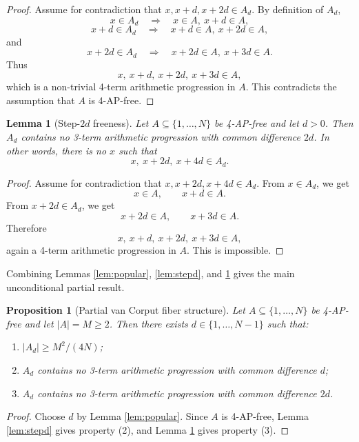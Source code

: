 \documentclass[11pt]{article}
\newtheorem{lemma}[theorem]{Lemma}
\newtheorem{proposition}[theorem]{Proposition}
\begin{document}
\begin{proof}
Assume for contradiction that \(x,x+d,x+2d\in A_d\).  By definition of \(A_d\),
\[
  x\in A_d \quad\Rightarrow\quad x\in A,\ x+d\in A,
\]
\[
  x+d\in A_d \quad\Rightarrow\quad x+d\in A,\ x+2d\in A,
\]
and
\[
  x+2d\in A_d \quad\Rightarrow\quad x+2d\in A,\ x+3d\in A.
\]
Thus
\[
  x,\ x+d,\ x+2d,\ x+3d\in A,
\]
which is a non-trivial 4-term arithmetic progression in \(A\).  This contradicts
the assumption that \(A\) is 4-AP-free.
\end{proof}

\begin{lemma}[Step-\(2d\) freeness]
\label{lem:step2d}
Let \(A\subseteq\{1,\ldots,N\}\) be 4-AP-free and let \(d>0\).  Then \(A_d\)
contains no 3-term arithmetic progression with common difference \(2d\).  In
other words, there is no \(x\) such that
\[
  x,\ x+2d,\ x+4d\in A_d.
\]
\end{lemma}

\begin{proof}
Assume for contradiction that \(x,x+2d,x+4d\in A_d\).  From \(x\in A_d\), we get
\[
  x\in A,\qquad x+d\in A.
\]
From \(x+2d\in A_d\), we get
\[
  x+2d\in A,\qquad x+3d\in A.
\]
Therefore
\[
  x,\ x+d,\ x+2d,\ x+3d\in A,
\]
again a 4-term arithmetic progression in \(A\).  This is impossible.
\end{proof}

Combining Lemmas \ref{lem:popular}, \ref{lem:stepd}, and \ref{lem:step2d} gives
the main unconditional partial result.

\begin{proposition}[Partial van Corput fiber structure]
\label{prop:partial}
Let \(A\subseteq\{1,\ldots,N\}\) be 4-AP-free and let \(|A|=M\geq 2\).  Then
there exists \(d\in\{1,\ldots,N-1\}\) such that:
\begin{enumerate}
  \item \( |A_d|\geq M^2/(4N)\);
  \item \(A_d\) contains no 3-term arithmetic progression with common difference \(d\);
  \item \(A_d\) contains no 3-term arithmetic progression with common difference \(2d\).
\end{enumerate}
\end{proposition}

\begin{proof}
Choose \(d\) by Lemma \ref{lem:popular}.  Since \(A\) is 4-AP-free, Lemma
\ref{lem:stepd} gives property (2), and Lemma \ref{lem:step2d} gives property
(3).
\end{proof}
\end{document}
